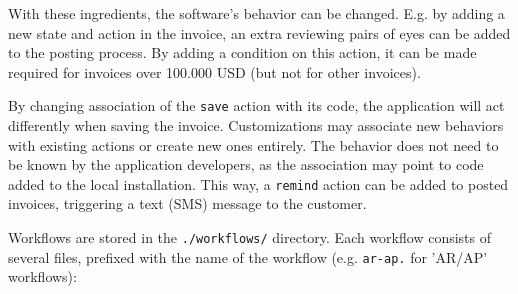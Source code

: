 With these ingredients, the software's behavior can be changed.  E.g. by adding a new state
and action in the invoice, an extra reviewing pairs of eyes can be added to the posting process.
By adding a condition on this action, it can be made required for invoices over 100.000 USD
(but not for other invoices).


By changing association of the \texttt{save} action with its code, the application will act
differently when saving the invoice.  Customizations may associate new behaviors with existing
actions or create new ones entirely.  The behavior does not need to be known by the application
developers, as the association may point to code added to the local installation.  This way, a
\texttt{remind} action can be added to posted invoices, triggering a text (SMS) message to the
customer.


Workflows are stored in the \texttt{./workflows/} directory.  Each workflow consists of
several files, prefixed with the name of the workflow (e.g. \texttt{ar-ap.} for 'AR/AP' workflows):


